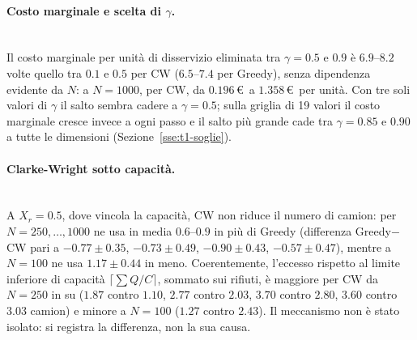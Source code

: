 \paragraph{Costo marginale e scelta di $\gamma$.}\mbox{}\\
Il costo marginale per unità di disservizio eliminata tra $\gamma=0.5$ e $0.9$ è $6.9$--$8.2$ volte quello tra $0.1$ e $0.5$ per CW ($6.5$--$7.4$ per Greedy), senza dipendenza evidente da $N$: a $N=1000$, per CW, da $0.196$\,\euro\ a $1.358$\,\euro\ per unità. Con tre soli valori di $\gamma$ il salto sembra cadere a $\gamma=0.5$; sulla griglia di 19 valori il costo marginale cresce invece a ogni passo e il salto più grande cade tra $\gamma=0.85$ e $0.90$ a tutte le dimensioni (Sezione~\ref{sse:t1-soglie}).

\paragraph{Clarke-Wright sotto capacità.}\mbox{}\\
A $X_r=0.5$, dove vincola la capacità, CW non riduce il numero di camion: per $N=250,\dots,1000$ ne usa in media $0.6$--$0.9$ in più di Greedy (differenza Greedy$-$CW pari a $-0.77\pm0.35$, $-0.73\pm0.49$, $-0.90\pm0.43$, $-0.57\pm0.47$), mentre a $N=100$ ne usa $1.17\pm0.44$ in meno. Coerentemente, l'eccesso rispetto al limite inferiore di capacità $\lceil\sum Q/C\rceil$, sommato sui rifiuti, è maggiore per CW da $N=250$ in su ($1.87$ contro $1.10$, $2.77$ contro $2.03$, $3.70$ contro $2.80$, $3.60$ contro $3.03$ camion) e minore a $N=100$ ($1.27$ contro $2.43$). Il meccanismo non è stato isolato: si registra la differenza, non la sua causa.

